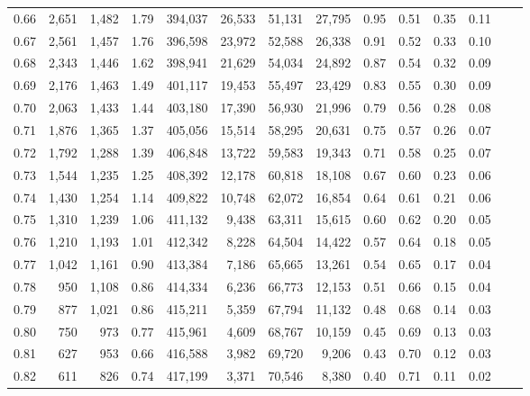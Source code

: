 \begin{tabular}{rrrrrrrrrrrrrr}
0.66 &  2,651 &  1,482 &    1.79 &  394,037 &   26,533 &  51,131 &  27,795 &  0.95 &  0.51 &  0.35 &      0.11 \\
0.67 &  2,561 &  1,457 &    1.76 &  396,598 &   23,972 &  52,588 &  26,338 &  0.91 &  0.52 &  0.33 &      0.10 \\
0.68 &  2,343 &  1,446 &    1.62 &  398,941 &   21,629 &  54,034 &  24,892 &  0.87 &  0.54 &  0.32 &      0.09 \\
0.69 &  2,176 &  1,463 &    1.49 &  401,117 &   19,453 &  55,497 &  23,429 &  0.83 &  0.55 &  0.30 &      0.09 \\
0.70 &  2,063 &  1,433 &    1.44 &  403,180 &   17,390 &  56,930 &  21,996 &  0.79 &  0.56 &  0.28 &      0.08 \\
0.71 &  1,876 &  1,365 &    1.37 &  405,056 &   15,514 &  58,295 &  20,631 &  0.75 &  0.57 &  0.26 &      0.07 \\
0.72 &  1,792 &  1,288 &    1.39 &  406,848 &   13,722 &  59,583 &  19,343 &  0.71 &  0.58 &  0.25 &      0.07 \\
0.73 &  1,544 &  1,235 &    1.25 &  408,392 &   12,178 &  60,818 &  18,108 &  0.67 &  0.60 &  0.23 &      0.06 \\
0.74 &  1,430 &  1,254 &    1.14 &  409,822 &   10,748 &  62,072 &  16,854 &  0.64 &  0.61 &  0.21 &      0.06 \\
0.75 &  1,310 &  1,239 &    1.06 &  411,132 &    9,438 &  63,311 &  15,615 &  0.60 &  0.62 &  0.20 &      0.05 \\
0.76 &  1,210 &  1,193 &    1.01 &  412,342 &    8,228 &  64,504 &  14,422 &  0.57 &  0.64 &  0.18 &      0.05 \\
0.77 &  1,042 &  1,161 &    0.90 &  413,384 &    7,186 &  65,665 &  13,261 &  0.54 &  0.65 &  0.17 &      0.04 \\
0.78 &    950 &  1,108 &    0.86 &  414,334 &    6,236 &  66,773 &  12,153 &  0.51 &  0.66 &  0.15 &      0.04 \\
0.79 &    877 &  1,021 &    0.86 &  415,211 &    5,359 &  67,794 &  11,132 &  0.48 &  0.68 &  0.14 &      0.03 \\
0.80 &    750 &    973 &    0.77 &  415,961 &    4,609 &  68,767 &  10,159 &  0.45 &  0.69 &  0.13 &      0.03 \\
0.81 &    627 &    953 &    0.66 &  416,588 &    3,982 &  69,720 &   9,206 &  0.43 &  0.70 &  0.12 &      0.03 \\
0.82 &    611 &    826 &    0.74 &  417,199 &    3,371 &  70,546 &   8,380 &  0.40 &  0.71 &  0.11 &      0.02 \\

\end{tabular}
